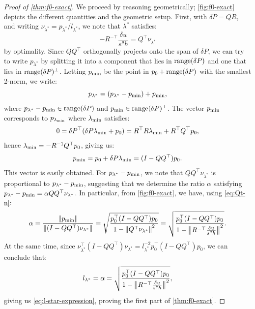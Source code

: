 \documentclass[sisc-eikonal.tex]{subfiles}
\begin{document}
\begin{proof}[Proof of \cref{thm:f0-exact}]
  We proceed by reasoning geometrically; \cref{fig:f0-exact} depicts
  the different quantities and the geometric setup. First, with
  $\delta P = QR$, and writing $\nu_{\lambda^*} = p_{\lambda^*}/l_{\lambda^*}$, we
  note that $\lambda^*$ satisfies:
  \begin{equation}\label{eq:Qt-n}
    - R^{-\top} \frac{\delta u}{s^\theta h} = Q^\top \nu_{\lambda^*}
  \end{equation}
  by optimality. Since $QQ^\top$ orthogonally projects onto the span
  of $\delta P$, we can try to write $p_{\lambda^*}$ by splitting it
  into a component that lies in $\operatorname{range}(\delta P)$ and one that lies
  in $\operatorname{range}(\delta P)^\perp$. Letting $p_{\operatorname{min}}$ be the point in
  $p_0 + \operatorname{range}(\delta P)$ with the smallest 2-norm, we write:
  \begin{equation}\label{eq:plam-decomp}
    p_{\lambda^*} = (p_{\lambda^*} - \pmin) + \pmin,
  \end{equation}
  where $p_{\lambda^*} - p_{\operatorname{min}} \in \operatorname{range}(\delta P)$ and
  $p_{\operatorname{min}} \in \operatorname{range}(\delta P)^\perp$. The vector $p_{\operatorname{min}}$ corresponds to
  $p_{\lambda_{\operatorname{min}}}$ where $\lambda_{\operatorname{min}}$ satisfies:
  \begin{equation}
    0 = \delta P^\top (\delta P \lambda_{\operatorname{min}} + p_0) = R^\top R \lambda_{\operatorname{min}} + R^\top Q^\top p_0,
  \end{equation}
  hence $\lambda_{\operatorname{min}} = -R^{-1} Q^\top p_0$, giving us:
  \begin{equation}\label{eq:pmin}
    \pmin = p_0 + \delta P \lambdamin = {(I - QQ^\top)} p_0.
  \end{equation}
  This vector is easily obtained. For $p_{\lambda^*} - p_{\operatorname{min}}$, we note
  that $QQ^\top \nu_{\lambda^*}$ is proportional to
  $p_{\lambda^*} - p_{\operatorname{min}}$, suggesting that we determine the ratio
  $\alpha$ satisfying
  $p_{\lambda^*} - p_{\operatorname{min}} = \alpha QQ^\top \nu_{\lambda^*}$. In
  particular, from \cref{fig:f0-exact}, we have, using \cref{eq:Qt-n}:
  \begin{equation}\label{eq:alpha-solve}
    \alpha = \frac{\norm{\pmin}}{\norm{(I - QQ^\top) \nu_{\lambda^*}}} = \sqrt{\frac{p_0^\top {(I - QQ^\top)} p_0}{1 - \norm{Q^\top \nu_{\lambda^*}}^2}} = \sqrt{\frac{p_0^\top {(I - QQ^\top)} p_0}{1 - \norm{R^{-\top} \frac{\delta u}{s^\theta h}}^2}}.
  \end{equation}
  At the same time, since
  $\nu_{\lambda^*}^\top (I - QQ^\top) \nu_{\lambda^*} = l_{\lambda^*}^{-2}
  p_0^\top (I - QQ^\top) p_0$, we can conclude that:
  \begin{equation}
    l_{\lambda^*} = \alpha = \sqrt{\frac{p_0^\top {(I - QQ^\top)} p_0}{1 - \left\|R^{-\top} \frac{\delta u}{s^\theta h}\right\|^2}},
  \end{equation}
  giving us \cref{eq:l-star-expression}, proving the first part of
  \cref{thm:f0-exact}.


\end{proof}
\end{document}
